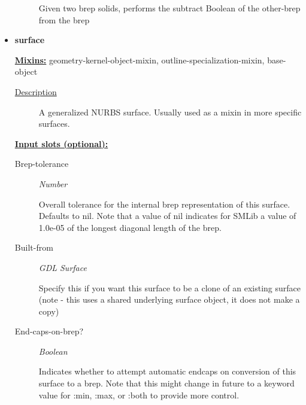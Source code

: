 \documentclass [11pt]{book}
\begin{document}
\begin{itemize}
\begin{description}
Given two brep solids, performs the subtract Boolean of the other-brep from the brep



\end{description}









\item {}
\label{prim:surface}
\textbf{surface}


\textbf{
\underline{Mixins:}} geometry-kernel-object-mixin, outline-specialization-mixin, base-object





\begin{description}

\item [
\underline{Description}]


A generalized NURBS surface. 
Usually used as a mixin in more specific surfaces.



\end{description}








\textbf{
\underline{Input slots (optional):}}

\begin{description}

\item [Brep-tolerance]
\emph{Number}

 Overall tolerance for the internal brep representation of this surface.
Defaults to nil. Note that a value of nil indicates for SMLib a value of 1.0e-05 of
the longest diagonal length of the brep.




\item [Built-from]
\emph{GDL Surface}

 Specify this if you want this surface to be a
clone of an existing surface (note - this uses a shared underlying
surface object, it does not make a copy)




\item [End-caps-on-brep?]
\emph{Boolean}

 Indicates whether to attempt automatic endcaps on conversion
of this surface to a brep.
Note that this might change in future to a keyword value
for :min, :max, or :both to provide more control.





\end{description}
\end{itemize}
\end{document}
